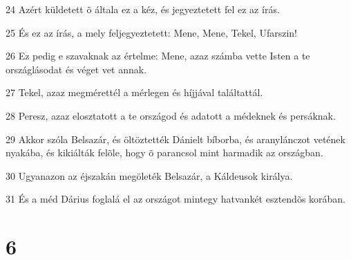 \par 24 Azért küldetett õ általa ez a kéz, és jegyeztetett fel ez az írás.
\par 25 És ez az írás, a mely feljegyeztetett: Mene, Mene, Tekel, Ufarszin!
\par 26 Ez pedig e szavaknak az értelme: Mene, azaz számba vette Isten a te országlásodat és véget vet annak.
\par 27 Tekel, azaz megmérettél a mérlegen és híjjával találtattál.
\par 28 Peresz, azaz elosztatott a te országod és adatott a médeknek és persáknak.
\par 29 Akkor szóla Belsazár, és öltöztették Dánielt bíborba, és aranylánczot vetének nyakába, és kikiálták felõle, hogy õ parancsol mint harmadik az országban.
\par 30 Ugyanazon az éjszakán megöleték Belsazár,  a Káldeusok királya.
\par 31 És a méd Dárius foglalá el az országot mintegy hatvankét esztendõs korában.

\chapter{6}


